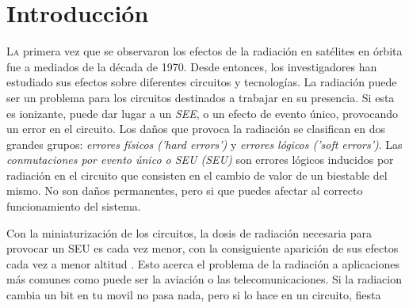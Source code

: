 \chapter{Introducción}
\label{ch:Introduccion}

\lettrine[lraise=-0.1, lines=2, loversize=0.2]{L}{a} primera vez que se observaron
los efectos de la radiación en satélites en órbita fue a mediados de la década de
1970. Desde entonces, los investigadores han estudiado sus efectos sobre
diferentes circuitos y tecnologías. La radiación puede ser un problema para los
circuitos destinados a trabajar en su presencia. Si esta es ionizante, puede dar
lugar a un \textit{\gls{SEE}}, o un efecto de evento único, provocando un error 
en el circuito. Los daños que provoca la radiación se clasifican en dos grandes 
grupos: \textit{errores físicos ('hard errors')} y \textit{errores lógicos ('soft
errors')}. Las \textit{conmutaciones por evento único o \acrlong{SEU}
(\acrshort{SEU})} son errores lógicos inducidos por radiación en el circuito
que consisten en el cambio de valor de un biestable del mismo. No son daños
permanentes, pero si que puedes afectar al correcto funcionamiento del sistema.

Con la miniaturización de los circuitos, la dosis de radiación necesaria para 
provocar un \gls{SEU} es cada vez menor, con la consiguiente aparición de sus 
efectos cada vez a menor altitud \cite{EDN}. Esto acerca el problema de la 
radiación a aplicaciones más comunes como puede ser la aviación o las 
telecomunicaciones. 
Si la radiacion cambia un bit en tu movil no pasa nada, pero si lo hace en un
circuito, fiesta



\endinput
